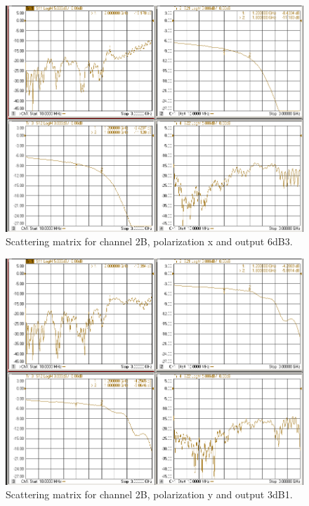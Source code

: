 \documentclass[12pt,a4paper,oneside]{article}
\begin{document}
\begin{figure}[H]
\centering
\includegraphics[width=0.9\linewidth]{VNA_results/2Bx_6dB3.png}
\caption{Scattering matrix for channel 2B, polarization x and output 6dB3.}
\label{fig:2Bx_6dB3}
\end{figure}


\begin{figure}[H]
\centering
\includegraphics[width=0.9\linewidth]{VNA_results/2By_3dB1.png}
\caption{Scattering matrix for channel 2B, polarization y and output 3dB1.}
\label{fig:2By_3dB1}
\end{figure}
\end{document}
